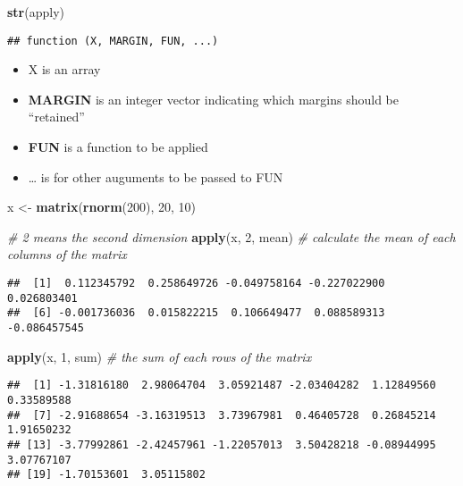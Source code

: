 \documentclass[
]{article}
\newenvironment{Shaded}{\begin{snugshade}}{\end{snugshade}}
\newcommand{\CommentTok}[1]{\textcolor[rgb]{0.56,0.35,0.01}{\textit{#1}}}
\newcommand{\DecValTok}[1]{\textcolor[rgb]{0.00,0.00,0.81}{#1}}
\newcommand{\KeywordTok}[1]{\textcolor[rgb]{0.13,0.29,0.53}{\textbf{#1}}}
\newcommand{\NormalTok}[1]{#1}
\newcommand{\StringTok}[1]{\textcolor[rgb]{0.31,0.60,0.02}{#1}}
\begin{document}
\begin{Shaded}
\begin{Highlighting}[]
\KeywordTok{str}\NormalTok{(apply)}
\end{Highlighting}
\end{Shaded}

\begin{verbatim}
## function (X, MARGIN, FUN, ...)
\end{verbatim}

\begin{itemize}
\item
  X is an array
\item
  \textbf{MARGIN} is an integer vector indicating which margins should
  be ``retained''
\item
  \textbf{FUN} is a function to be applied
\item
  \ldots{} is for other auguments to be passed to FUN
\end{itemize}

\begin{Shaded}
\begin{Highlighting}[]
\NormalTok{x \textless{}{-}}\StringTok{ }\KeywordTok{matrix}\NormalTok{(}\KeywordTok{rnorm}\NormalTok{(}\DecValTok{200}\NormalTok{), }\DecValTok{20}\NormalTok{, }\DecValTok{10}\NormalTok{)}

\CommentTok{\# 2 means the second dimension}
\KeywordTok{apply}\NormalTok{(x, }\DecValTok{2}\NormalTok{, mean) }\CommentTok{\# calculate the mean of each columns of the matrix}
\end{Highlighting}
\end{Shaded}

\begin{verbatim}
##  [1]  0.112345792  0.258649726 -0.049758164 -0.227022900  0.026803401
##  [6] -0.001736036  0.015822215  0.106649477  0.088589313 -0.086457545
\end{verbatim}

\begin{Shaded}
\begin{Highlighting}[]
\KeywordTok{apply}\NormalTok{(x, }\DecValTok{1}\NormalTok{, sum) }\CommentTok{\# the sum of each rows of the matrix}
\end{Highlighting}
\end{Shaded}

\begin{verbatim}
##  [1] -1.31816180  2.98064704  3.05921487 -2.03404282  1.12849560  0.33589588
##  [7] -2.91688654 -3.16319513  3.73967981  0.46405728  0.26845214  1.91650232
## [13] -3.77992861 -2.42457961 -1.22057013  3.50428218 -0.08944995  3.07767107
## [19] -1.70153601  3.05115802
\end{verbatim}
\end{document}
